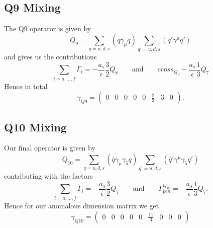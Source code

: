 	\subsection*{Q9 Mixing}
	The Q9 operator is given by
	\begin{equation}
		Q_9 = \sum_{q=u,d,s}(\bar q \gamma_\mu q) \sum_{q'=u,d,s}(\bar q' \gamma^\mu q')
	\end{equation}
	and gives us the contributions
	\begin{equation}
		\sum_{i=a,\ldots,f} \Gamma_i = -\frac{a_s}{\epsilon} \frac{3}{2}Q_8 \qquad \text{and} \qquad cross_{Q_9} - \frac{a_s}{\epsilon} \frac{1}{3} Q_7
	\end{equation}
	Hence in total
	\begin{equation}
		\gamma_{Q9} = 
		\begin{pmatrix}
			0 & 0 & 0 & 0 & 0 & \frac{2}{3} & 3 & 0 
		\end{pmatrix}.
	\end{equation}
	
	\subsection*{Q10 Mixing}
	Our final operator is given by
	\begin{equation}
		Q_{10} = \sum_{q=u,d,s}(\bar q \gamma_\mu \gamma_5 q) \sum_{q'=u,d,s} (\bar q' \gamma^\mu \gamma_5 q')
	\end{equation}
	contributing with the factors
	\begin{equation}
		\sum_{i=a,\ldots,f} \Gamma_i = -\frac{a_s}{\epsilon} \frac{3}{2} Q_7 \qquad \text{and} \qquad \Gamma^{Q_{10}}_{pen} = -\frac{a_s}{\epsilon} \frac{1}{3} Q_7.
	\end{equation}
	Hence for our anomalous dimension matrix we get
	\begin{equation}
		\gamma_{Q10} =
		\begin{pmatrix}
			0 & 0 & 0 & 0 & 0 & \frac{11}{3} & 0 & 0 & 0  
		\end{pmatrix}
	\end{equation}

